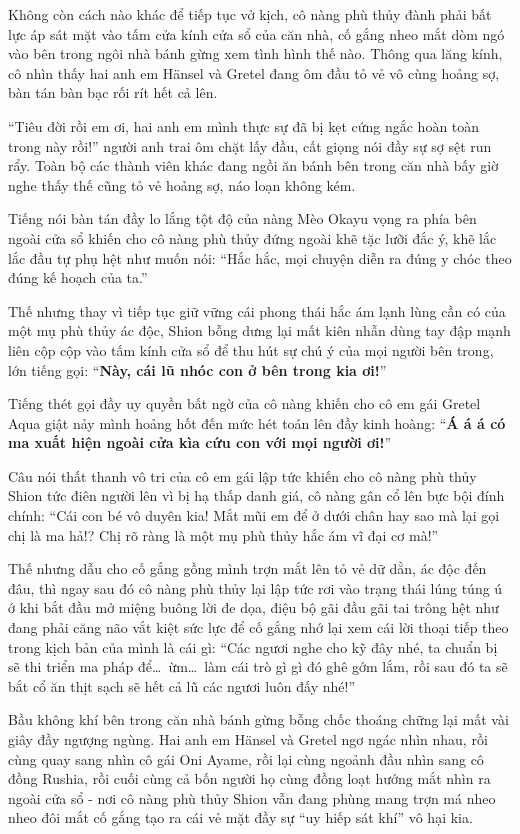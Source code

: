 \documentclass[../main.tex]{subfiles}
\begin{document}
Không còn cách nào khác để tiếp tục vở kịch, cô nàng phù thủy đành phải bất lực áp sát mặt vào tấm cửa kính cửa sổ của căn nhà, cố gắng nheo mắt dòm ngó vào bên trong ngôi nhà bánh gừng xem tình hình thế nào. Thông qua lăng kính, cô nhìn thấy hai anh em Hänsel và Gretel đang ôm đầu tỏ vẻ vô cùng hoảng sợ, bàn tán bàn bạc rối rít hết cả lên.

``Tiêu đời rồi em ơi, hai anh em mình thực sự đã bị kẹt cứng ngắc hoàn toàn trong này rồi!'' người anh trai ôm chặt lấy đầu, cất giọng nói đầy sự sợ sệt run rẩy. Toàn bộ các thành viên khác đang ngồi ăn bánh bên trong căn nhà bấy giờ nghe thấy thế cũng tỏ vẻ hoảng sợ, náo loạn không kém.

Tiếng nói bàn tán đầy lo lắng tột độ của nàng Mèo Okayu vọng ra phía bên ngoài cửa sổ khiến cho cô nàng phù thủy đứng ngoài khẽ tặc lưỡi đắc ý, khẽ lắc lắc đầu tự phụ hệt như muốn nói: ``Hắc hắc, mọi chuyện diễn ra đúng y chóc theo đúng kế hoạch của ta.''

Thế nhưng thay vì tiếp tục giữ vững cái phong thái hắc ám lạnh lùng cần có của một mụ phù thủy ác độc, Shion bỗng dưng lại mất kiên nhẫn dùng tay đập mạnh liên cộp cộp vào tấm kính cửa sổ để thu hút sự chú ý của mọi người bên trong, lớn tiếng gọi: ``\textbf{Này, cái lũ nhóc con ở bên trong kia ơi!}''

Tiếng thét gọi đầy uy quyền bất ngờ của cô nàng khiến cho cô em gái Gretel Aqua giật nảy mình hoảng hốt đến mức hét toán lên đầy kinh hoàng: ``\textbf{Á á á có ma xuất hiện ngoài cửa kìa cứu con với mọi người ơi!}''

Câu nói thất thanh vô tri của cô em gái lập tức khiến cho cô nàng phù thủy Shion tức điên người lên vì bị hạ thấp danh giá, cô nàng gân cổ lên bực bội đính chính: ``Cái con bé vô duyên kia! Mắt mũi em để ở dưới chân hay sao mà lại gọi chị là ma hả!? Chị rõ ràng là một mụ phù thủy hắc ám vĩ đại cơ mà!''


Thế nhưng dẫu cho cố gắng gồng mình trợn mắt lên tỏ vẻ dữ dằn, ác độc đến đâu, thì ngay sau đó cô nàng phù thủy lại lập tức rơi vào trạng thái lúng túng ú ớ khi bắt đầu mở miệng buông lời đe dọa, điệu bộ gãi đầu gãi tai trông hệt như đang phải căng não vắt kiệt sức lực để cố gắng nhớ lại xem cái lời thoại tiếp theo trong kịch bản của mình là cái gì: ``Các ngươi nghe cho kỹ đây nhé, ta chuẩn bị sẽ thi triển ma pháp để\dots\ ừm\dots\ làm cái trò gì gì đó ghê gớm lắm, rồi sau đó ta sẽ bắt cổ ăn thịt sạch sẽ hết cả lũ các ngươi luôn đấy nhé!''

Bầu không khí bên trong căn nhà bánh gừng bỗng chốc thoáng chững lại mất vài giây đầy ngượng ngùng. Hai anh em Hänsel và Gretel ngơ ngác nhìn nhau, rồi cùng quay sang nhìn cô gái Oni Ayame, rồi lại cùng ngoảnh đầu nhìn sang cô đồng Rushia, rồi cuối cùng cả bốn người họ cùng đồng loạt hướng mắt nhìn ra ngoài cửa sổ - nơi cô nàng phù thủy Shion vẫn đang phùng mang trợn má nheo nheo đôi mắt cố gắng tạo ra cái vẻ mặt đầy sự ``uy hiếp sát khí'' vô hại kia.
\end{document}
